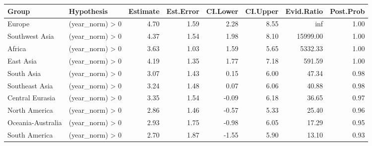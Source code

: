 \begin{tabular}{llrrrrrr}
\toprule
Group & Hypothesis & Estimate & Est.Error & CI.Lower & CI.Upper & Evid.Ratio & Post.Prob \\
\midrule
Europe & (year_norm) > 0 & 4.70 & 1.59 & 2.28 & 8.55 & inf & 1.00 \\
Southwest Asia & (year_norm) > 0 & 4.37 & 1.54 & 1.98 & 8.10 & 15999.00 & 1.00 \\
Africa & (year_norm) > 0 & 3.63 & 1.03 & 1.59 & 5.65 & 5332.33 & 1.00 \\
East Asia & (year_norm) > 0 & 4.19 & 1.35 & 1.77 & 7.18 & 591.59 & 1.00 \\
South Asia & (year_norm) > 0 & 3.07 & 1.43 & 0.15 & 6.00 & 47.34 & 0.98 \\
Southeast Asia & (year_norm) > 0 & 3.24 & 1.48 & 0.07 & 6.06 & 40.88 & 0.98 \\
Central Eurasia & (year_norm) > 0 & 3.35 & 1.54 & -0.09 & 6.18 & 36.65 & 0.97 \\
North America & (year_norm) > 0 & 2.86 & 1.46 & -0.57 & 5.33 & 25.40 & 0.96 \\
Oceania-Australia & (year_norm) > 0 & 2.93 & 1.75 & -0.98 & 6.05 & 17.29 & 0.95 \\
South America & (year_norm) > 0 & 2.70 & 1.87 & -1.55 & 5.90 & 13.10 & 0.93 \\
\bottomrule
\end{tabular}
